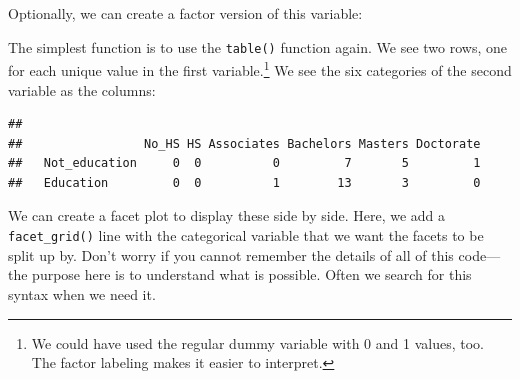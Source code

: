 \documentclass[
]{article}
\newenvironment{Shaded}{\begin{snugshade}}{\end{snugshade}}
\newcommand{\DataTypeTok}[1]{\textcolor[rgb]{0.13,0.29,0.53}{#1}}
\newcommand{\DecValTok}[1]{\textcolor[rgb]{0.00,0.00,0.81}{#1}}
\newcommand{\KeywordTok}[1]{\textcolor[rgb]{0.13,0.29,0.53}{\textbf{#1}}}
\newcommand{\NormalTok}[1]{#1}
\newcommand{\OperatorTok}[1]{\textcolor[rgb]{0.81,0.36,0.00}{\textbf{#1}}}
\newcommand{\StringTok}[1]{\textcolor[rgb]{0.31,0.60,0.02}{#1}}
\begin{document}
Optionally, we can create a factor version of this variable:

\begin{Shaded}
\end{Shaded}

The simplest function is to use the \texttt{table()} function again. We see two rows, one for each unique value in the first variable.\footnote{We could have used the regular dummy variable with 0 and 1 values, too. The factor labeling makes it easier to interpret.} We see the six categories of the second variable as the columns:

\begin{Shaded}
\end{Shaded}

\begin{verbatim}
##                
##                 No_HS HS Associates Bachelors Masters Doctorate
##   Not_education     0  0          0         7       5         1
##   Education         0  0          1        13       3         0
\end{verbatim}

We can create a facet plot to display these side by side. Here, we add a \texttt{facet\_grid()} line with the categorical variable that we want the facets to be split up by. Don't worry if you cannot remember the details of all of this code---the purpose here is to understand what is possible. Often we search for this syntax when we need it.
\end{document}
